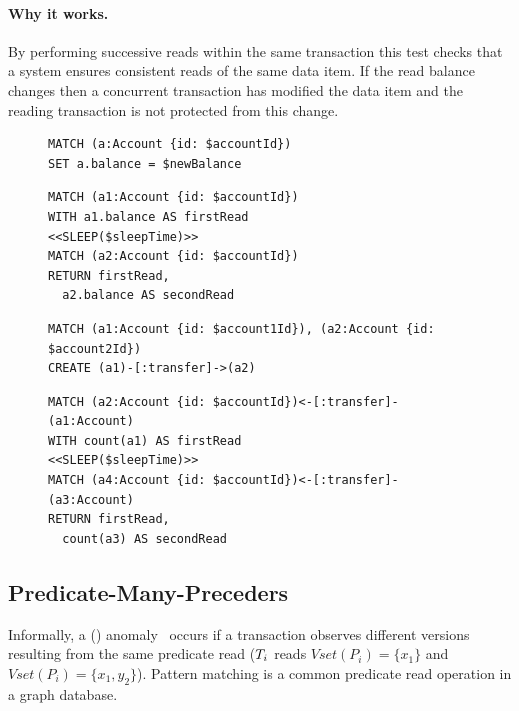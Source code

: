 \paragraph{Why it works.}
By performing successive reads within the same transaction this test checks that
a system ensures consistent reads of the same data item. If the read balance
changes then a concurrent transaction has modified the data item and the reading
transaction is not protected from this change.

\begin{figure}[htb]
  \centering
  \begin{minipage}{0.35\linewidth}
    \begin{lstlisting}[language=cypher,label=fig:ic1,caption=\tx{IMP $T_\mathrm{W}$}.]
MATCH (a:Account {id: $accountId})
SET a.balance = $newBalance
\end{lstlisting}
    \begin{lstlisting}[language=cypher,label=fig:ic2,caption=\tx{IMP $T_\mathrm{R}$}.]
MATCH (a1:Account {id: $accountId})
WITH a1.balance AS firstRead
<<SLEEP($sleepTime)>>
MATCH (a2:Account {id: $accountId})
RETURN firstRead, 
  a2.balance AS secondRead
\end{lstlisting}
  \end{minipage}
  \quad
  \begin{minipage}{0.61\linewidth}
    \begin{lstlisting}[language=cypher,label=fig:pc1,caption=\tx{PMP $T_\mathrm{W}$}.]
MATCH (a1:Account {id: $account1Id}), (a2:Account {id: $account2Id})
CREATE (a1)-[:transfer]->(a2)
\end{lstlisting}
    \begin{lstlisting}[language=cypher,label=fig:pc2,caption=\tx{PMP $T_\mathrm{R}$}.]
MATCH (a2:Account {id: $accountId})<-[:transfer]-(a1:Account)
WITH count(a1) AS firstRead
<<SLEEP($sleepTime)>>
MATCH (a4:Account {id: $accountId})<-[:transfer]-(a3:Account)
RETURN firstRead, 
  count(a3) AS secondRead
\end{lstlisting}
  \end{minipage}
\end{figure}

\subsection*{Predicate-Many-Preceders}

Informally, a  ()
anomaly~\cite{DBLP:journals/pvldb/BailisDFGHS13} occurs if a transaction observes
different versions resulting from the same predicate read
(\eg $T_i$ reads
$\textit{Vset}(P_i) =  \{x_1\}$ and
$\textit{Vset}(P_i) = \{x_1,y_2\}$).
Pattern matching is a common predicate read operation in a graph database.


